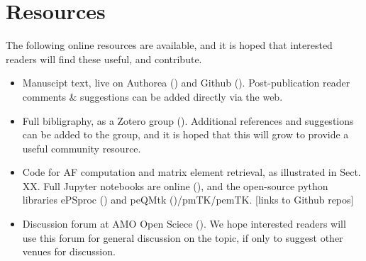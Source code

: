 \section{Resources}

The following online resources are available, and it is hoped that interested readers will find these useful, and contribute.

\begin{itemize}
\item Manuscipt text, live on Authorea () and Github (). Post-publication reader comments \& suggestions can be added directly via the web.
\item Full bibligraphy, as a Zotero group (). Additional references and suggestions can be added to the group, and it is hoped that this will grow to provide a useful community resource.
\item Code for AF computation and matrix element retrieval, as illustrated in Sect. XX. Full Jupyter notebooks are online (), and the open-source python libraries ePSproc () and peQMtk ()/pmTK/pemTK. [links to Github repos]
\item Discussion forum at AMO Open Sciece (). We hope interested readers will use this forum for general discussion on the topic, if only to suggest other venues for discussion.
\end{itemize}
